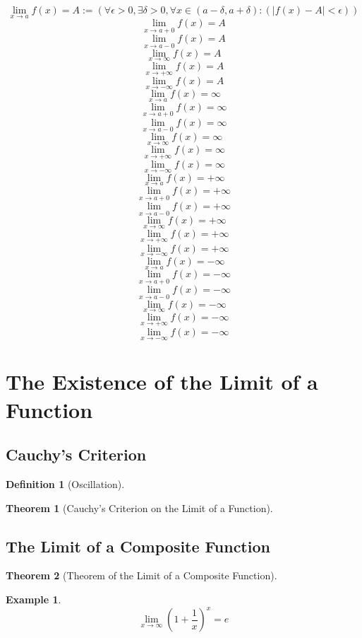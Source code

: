 \documentclass[onecolumn]{ctexart}
\newtheorem{definition}{Definition}
\newtheorem{theorem}{Theorem}
\newtheorem{example}{Example}
\begin{document}
\[
  \lim_{x \to a} f(x) = A := (\forall \epsilon > 0, \exists \delta > 0, \forall x \in (a - \delta, a + \delta): (|f(x) - A| < \epsilon))
\]
\[
  \lim_{x \to a+0} f(x) = A 
\]
\[
  \lim_{x \to a-0} f(x) = A  
\]
\[
  \lim_{x \to \infty} f(x) = A  
\]
\[
  \lim_{x \to +\infty} f(x) = A  
\]
\[
  \lim_{x \to -\infty} f(x) = A  
\]
\[
  \lim_{x \to a} f(x) = \infty
\]
\[
  \lim_{x \to a+0} f(x) = \infty
\]
\[
  \lim_{x \to a-0} f(x) = \infty
\]
\[
  \lim_{x \to \infty} f(x) = \infty
\]
\[
  \lim_{x \to +\infty} f(x) = \infty
\]
\[
  \lim_{x \to -\infty} f(x) = \infty
\]
\[
  \lim_{x \to a} f(x) = +\infty
\]
\[
  \lim_{x \to a+0} f(x) = +\infty
\]
\[
  \lim_{x \to a-0} f(x) = +\infty
\]
\[
  \lim_{x \to \infty} f(x) = +\infty
\]
\[
  \lim_{x \to +\infty} f(x) = +\infty
\]
\[
  \lim_{x \to -\infty} f(x) = +\infty
\]
\[
  \lim_{x \to a} f(x) = -\infty
\]
\[
  \lim_{x \to a+0} f(x) = -\infty
\]
\[
  \lim_{x \to a-0} f(x) = -\infty
\]
\[
  \lim_{x \to \infty} f(x) = -\infty
\]
\[
  \lim_{x \to +\infty} f(x) = -\infty
\]
\[
  \lim_{x \to -\infty} f(x) = -\infty
\]

\section{The Existence of the Limit of a Function}

\subsection{Cauchy's Criterion}

\begin{definition}[Oscillation]
  
\end{definition}

\begin{theorem}[Cauchy's Criterion on the Limit of a Function]
  
\end{theorem}

\subsection{The Limit of a Composite Function}

\begin{theorem}[Theorem of the Limit of a Composite Function]
  
\end{theorem}

\begin{example}
  \begin{equation}
    \lim_{x \to \infty} (1 + \frac{1}{x})^x = e
  \end{equation}
\end{example}
\end{document}
